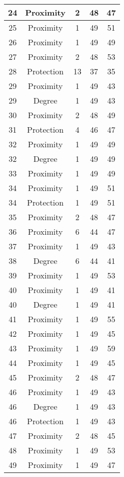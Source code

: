 \documentclass[results.tex]{subfiles}
\begin{document}
\begin{center}
\begin{tabular}{| c || c | c | c | c |}
    \hline
    24 & Proximity & 2 & 48 & 47 \\ 
    \hline
    25 & Proximity & 1 & 49 & 51 \\ 
    \hline
    26 & Proximity & 1 & 49 & 49 \\ 
    \hline
    27 & Proximity & 2 & 48 & 53 \\ 
    \hline
    28 & Protection & 13 & 37 & 35 \\ 
    \hline
    29 & Proximity & 1 & 49 & 43 \\ 
    \hline
    29 & Degree & 1 & 49 & 43 \\ 
    \hline
    30 & Proximity & 2 & 48 & 49 \\ 
    \hline
    31 & Protection & 4 & 46 & 47 \\ 
    \hline
    32 & Proximity & 1 & 49 & 49 \\ 
    \hline
    32 & Degree & 1 & 49 & 49 \\ 
    \hline
    33 & Proximity & 1 & 49 & 49 \\ 
    \hline
    34 & Proximity & 1 & 49 & 51 \\ 
    \hline
    34 & Protection & 1 & 49 & 51 \\ 
    \hline
    35 & Proximity & 2 & 48 & 47 \\ 
    \hline
    36 & Proximity & 6 & 44 & 47 \\ 
    \hline
    37 & Proximity & 1 & 49 & 43 \\ 
    \hline
    38 & Degree & 6 & 44 & 41 \\ 
    \hline
    39 & Proximity & 1 & 49 & 53 \\ 
    \hline
    40 & Proximity & 1 & 49 & 41 \\ 
    \hline
    40 & Degree & 1 & 49 & 41 \\ 
    \hline
    41 & Proximity & 1 & 49 & 55 \\ 
    \hline
    42 & Proximity & 1 & 49 & 45 \\ 
    \hline
    43 & Proximity & 1 & 49 & 59 \\ 
    \hline
    44 & Proximity & 1 & 49 & 45 \\ 
    \hline
    45 & Proximity & 2 & 48 & 47 \\ 
    \hline
    46 & Proximity & 1 & 49 & 43 \\ 
    \hline
    46 & Degree & 1 & 49 & 43 \\ 
    \hline
    46 & Protection & 1 & 49 & 43 \\ 
    \hline
    47 & Proximity & 2 & 48 & 45 \\ 
    \hline
    48 & Proximity & 1 & 49 & 53 \\ 
    \hline
    49 & Proximity & 1 & 49 & 47 \\ 
    \hline   \end{tabular}
\end{center}
\end{document}
